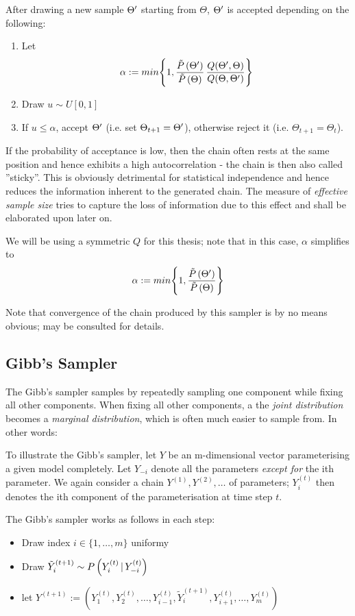 	After drawing a new sample $\Theta^\prime$ starting from $\Theta$, $\Theta^\prime$ is accepted depending on the following:
	\begin{enumerate}
		\item Let 
		\begin{align}
			\alpha := min \Bigg\{ 1,  \frac{\tilde{P}\left(\Theta^\prime\right)}{\tilde{P}\left(\Theta\right)} \, \frac{Q(\Theta^\prime, \Theta)}{Q(\Theta, \Theta^\prime)}			
			\Bigg\}
			\label{alphaSamplingStep}
		\end{align}
		\item Draw $u \sim U[0, 1]$
		\item If $u \leq \alpha$, accept $\Theta^\prime$ (i.e. set $\Theta_{t+1} = \Theta^\prime$), otherwise reject it (i.e. $\Theta_{t+1} = \Theta_t$). 
	\end{enumerate} 
	If the probability of acceptance is low, then the chain often rests at the same position and hence exhibits a high autocorrelation - the chain is then also called ''sticky''. This is obviously detrimental for statistical independence and hence reduces the information inherent to the generated chain. 
	The measure of \textit{effective sample size} tries to capture the loss of information due to this effect and shall be elaborated upon later on.

	We will be using a symmetric $Q$ for this thesis; note that in this case,  $\alpha$ simplifies to 
	\[
			\alpha := min \Bigg\{ 1,  \frac{\tilde{P}\left(\Theta^\prime\right)}{\tilde{P}\left(\Theta\right)}			
		\Bigg\}
	\]
	
	
	Note that convergence of the chain produced by this sampler is by no means obvious; \cite{mcnotes} may be consulted for details. 
	
	
	
	\subsection{Gibb's Sampler}
	The Gibb's sampler samples by repeatedly sampling one component while fixing all other components. When fixing all other components, a the \textit{joint distribution} becomes a \textit{marginal distribution}, which is often much easier to sample from. In other words:
	
	To illustrate the Gibb's sampler, let $Y$ be an m-dimensional vector parameterising a given model completely. Let $Y_{-i}$ denote all the parameters \textit{except for} the ith parameter.
	We again consider a chain $Y^{(1)}, Y^{(2)}, \dots$ of parameters; $Y_i^{(t)}$ then denotes the ith component of the parameterisation at time step $t$. 
	
	The Gibb's sampler works as follows in each step:
	\begin{itemize}
		\item Draw index $i \in \{1, \dots, m\}$ uniformy
		\item Draw $\tilde{Y}^{(t+1)}_i \sim P\left(Y^{(t)}_i \, | \, Y^{(t)}_{-i}\right)$
		\item let $Y^{(t+1)} := \left(
				Y^{(t)}_1, Y^{(t)}_2, \dots, Y^{(t)}_{i-1}, 
				\tilde{Y}^{(t+1)}_i, 
				Y^{(t)}_{i+1}, \dots, Y^{(t)}_m
			\right)$
	\end{itemize}
	
